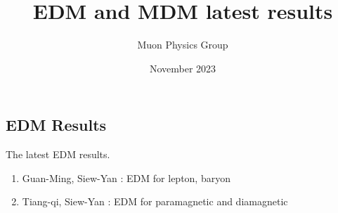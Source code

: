 \documentclass[12pt]{article}
\title{EDM and MDM latest results}
\author{Muon Physics Group}
\date{November 2023}
\begin{document}
\begin{landscape}

\section{EDM Results}

\noindent The latest EDM results.
\begin{enumerate}
\item Guan-Ming, Siew-Yan : EDM for lepton, baryon
\item Tiang-qi, Siew-Yan  : EDM for paramagnetic and diamagnetic
\end{enumerate}


\end{landscape}
\end{document}
